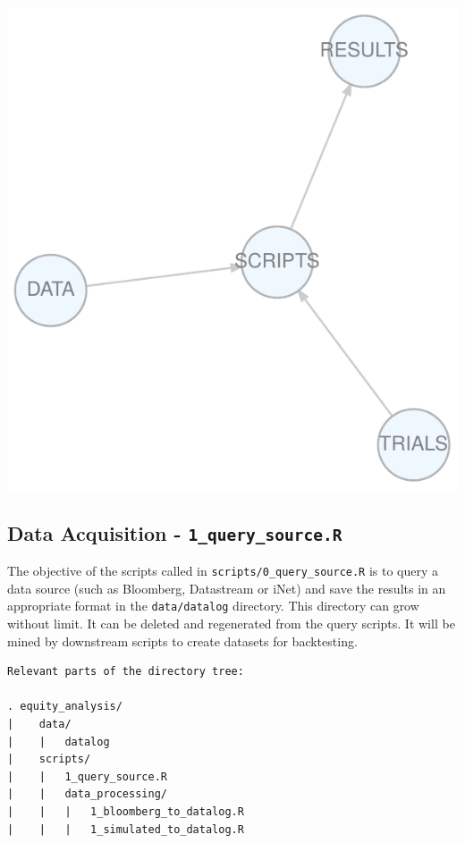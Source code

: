 \documentclass[11pt,preprint, authoryear]{elsarticle}
\let\origfigure\figure
\let\endorigfigure\endfigure
\renewenvironment{figure}[1][2] {
    \expandafter\origfigure\expandafter[H]
} {
    \endorigfigure
}
\numberwithin{equation}{section}
\numberwithin{figure}{section}
\numberwithin{table}{section}
\begin{document}
\begin{figure}
\centering
\includegraphics{data/coarse_workflow.pdf}
\caption{Coarse Analytical Workflow\label{Coarse Flow}}
\end{figure}

\newpage

\subsection{\texorpdfstring{Data Acquisition -
\texttt{1\_query\_source.R}}{Data Acquisition - 1\_query\_source.R}}\label{data-acquisition---1_query_source.r}

The objective of the scripts called in
\texttt{scripts/0\_query\_source.R} is to query a data source (such as
Bloomberg, Datastream or iNet) and save the results in an appropriate
format in the \texttt{data/datalog} directory. This directory can grow
without limit. It can be deleted and regenerated from the query scripts.
It will be mined by downstream scripts to create datasets for
backtesting.

\begin{verbatim}
Relevant parts of the directory tree: 

. equity_analysis/
|    data/
|    |   datalog
|    scripts/
|    |   1_query_source.R
|    |   data_processing/
|    |   |   1_bloomberg_to_datalog.R
|    |   |   1_simulated_to_datalog.R
\end{verbatim}
\end{document}
